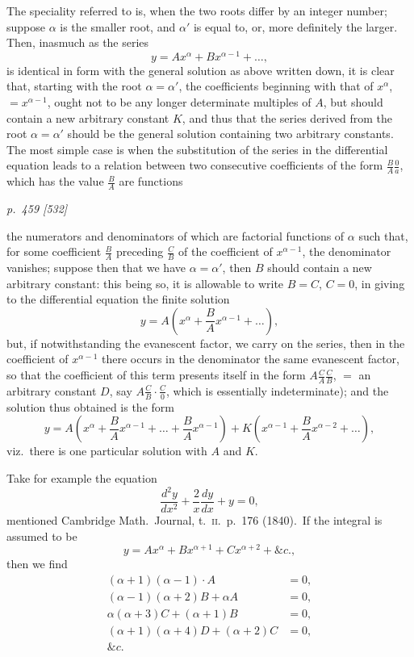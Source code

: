 \documentclass[11pt,a4paper]{book}
\begin{document}
The speciality referred to is, when the two roots differ by an integer number;
suppose $\alpha$ is the smaller root, and $\alpha'$ is equal to, or, more definitely the larger. Then,
inasmuch as the series
\[
y = Ax^\alpha + Bx^{\alpha-1} + \ldots,
\]
is identical in form with the general solution as above written down, it is clear that,
starting with the root $\alpha = \alpha'$, the coefficients beginning with that of $x^\alpha$, $= x^{\alpha-1}$, ought
not to be any longer determinate multiples of $A$, but should contain a new arbitrary
constant $K$, and thus that the series derived from the root $\alpha = \alpha'$ should be the
general solution containing two arbitrary constants. The most simple case is when
the substitution of the series in the differential equation leads to a relation between
two consecutive coefficients of the form $\frac{B}{A} \frac{0}{a}$, which has the value $\frac{B}{A}$ are functions

\clearpage

\bigskip
\textit{p.~459 [532]}
\smallskip

the numerators and denominators of which are factorial functions of $\alpha$ such that, for
some coefficient $\frac{B}{A}$ preceding $\frac{C}{B}$ of the coefficient of $x^{\alpha-1}$, the denominator vanishes;
suppose then that we have $\alpha = \alpha'$, then $B$ should contain a new arbitrary
constant: this being so, it is allowable to write $B = C$, $C = 0$, in giving to the
differential equation the finite solution
\[
y = A\left(x^\alpha + \frac{B}{A}x^{\alpha-1} + \ldots\right),
\]
but, if notwithstanding the evanescent factor, we carry on the series, then in the
coefficient of $x^{\alpha-1}$ there occurs in the denominator the same evanescent factor, so
that the coefficient of this term presents itself in the form $A\frac{C}{A} \frac{C}{B}$, $=$ an arbitrary constant $D$, say $A\frac{C}{B} \cdot \frac{C}{0}$, which is essentially indeterminate); and the solution thus
obtained is the form
\[
y = A\left(x^\alpha + \frac{B}{A}x^{\alpha-1} + \ldots + \frac{B}{A}x^{\alpha-1}\right) + K\left(x^{\alpha-1} + \frac{B}{A}x^{\alpha-2} + \ldots\right),
\]
viz.\ there is one particular solution with $A$ and $K$.

Take for example the equation
\[
\frac{d^2y}{dx^2} + \frac{2}{x}\frac{dy}{dx} + y = 0, \tag{I}
\]
mentioned Cambridge Math.\ Journal, t.~\textsc{ii.}\ p.~176 (1840).\ If the integral is assumed to
be
\[
y = Ax^\alpha + Bx^{\alpha+1} + Cx^{\alpha+2} + \&c.,
\]
then we find
\begin{align*}
(\alpha + 1)(\alpha - 1)\cdot A &= 0,\\
(\alpha - 1)(\alpha + 2)B + \alpha A &= 0,\\
\alpha(\alpha + 3)C + (\alpha + 1)B &= 0,\\
(\alpha + 1)(\alpha + 4)D + (\alpha + 2)C &= 0,\\
\&c.
\end{align*}
\end{document}

